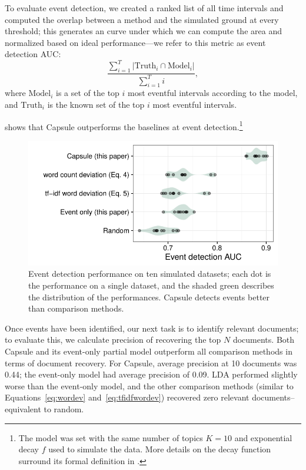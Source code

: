 To evaluate event detection, we created a ranked list of all time intervals and computed the overlap between a method and the simulated ground at every threshold; this generates an curve under which we can compute the area and normalized based on ideal performance---we refer to this metric as event detection AUC:
\begin{equation}
\frac{\sum_{i=1}^T \vert \mbox{Truth}_i \cap \mbox{Model}_i \vert}{\sum_{i=1}^T i},
\end{equation}
where $\mbox{Model}_i$ is a set of the top $i$ most eventful intervals
according to the model, and $\mbox{Truth}_i$ is the known set of the
top $i$ most eventful intervals.

 shows that Capsule outperforms the
baselines at event detection.\footnote{The model was
  set with the same number of topics $K=10$ and exponential decay $f$
  used to simulate the data.  More details on the decay function
  surround its formal definition in .}




\begin{figure}[ht]
\centering
\includegraphics[width=\linewidth]{fig/sim_eventdetect.pdf}
\caption{Event detection performance on ten simulated datasets; each dot is the performance on a single dataset, and the shaded green describes the distribution of the performances.  Capsule detects events better than comparison methods.}
\label{fig:sim_eventdetect}
\end{figure}

Once events have been identified, our next task is to identify
relevant documents; to evaluate this, we calculate precision of
recovering the top $N$ documents.  Both Capsule and its event-only
partial model outperform all comparison methods in terms of document
recovery.  For Capsule, average precision at 10 documents was 0.44;
the event-only model had average precision of 0.09.  LDA performed
slightly worse than the event-only model, and the other comparison
methods (similar to Equations~\ref{eq:wordev}
and~\ref{eq:tfidfwordev}) recovered zero relevant
documents--equivalent to random.



